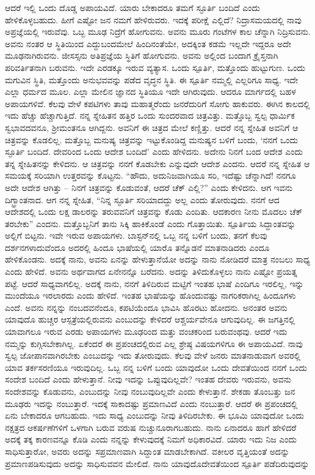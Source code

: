 ಆದರೆ ಇಲ್ಲಿ ಒಂದು ದೊಡ್ಡ ಅಪಾಯವಿದೆ. ಯಾರು ಬೇಕಾದರೂ ತಮಗೆ ಸ್ಫೂರ್ತಿ ಬಂದಿದೆ ಎಂದು ಹೇಳಿಕೊಳ್ಳಬಹುದು. ಹೀಗೆ ಎಷ್ಟೋ ಜನ ನಮಗೆ ಹೇಳಿರುವರು. ಇದಕ್ಕೆ ಪರೀಕ್ಷೆ ಎಲ್ಲಿದೆ? ನಿದ್ರಾಸಮಯದಲ್ಲಿ ನಾವು ಅಪ್ರಜ್ಞೆಯಲ್ಲಿ ಇರುವೆವು. ಒಬ್ಬ ಮೂಢ ನಿದ್ರೆಗೆ ಹೋಗುವನು. ಅವನು ಮೂರು ಗಂಟೆಗಳ ಕಾಲ ಚೆನ್ನಾಗಿ ನಿದ್ರಿಸುವನು. ಅವನು ನಂತರ ಆ ಸ್ಥಿತಿಯಿಂದ ಎದ್ದುಬಂದಮೇಲೆ ಹಿಂದಿನಂತೆಯೇ, ಅದಕ್ಕಿಂತ ಕಡಮೆ ಇಲ್ಲದೇ ಇದ್ದರೂ ಅದೇ ಮೂಢನಾಗಿರುವನು. ಜೀಸಸ್ಸನು ಅತಿಪ್ರಜ್ಞೆಯ ಸ್ಥಿತಿಗೆ ಹೋಗುವನು. ಅವನು ಅಲ್ಲಿಂದ ಬಂದಾಗ ಕ್ರೈಸ್ತನಾಗಿ ಪರಿವರ್ತಿತನಾಗಿ ಬರುವನು. ಇದೇ ಎರಡಕ್ಕೂ ಇರುವ ವ್ಯತ್ಯಾಸ. ಒಂದು ಸ್ಪೂರ್ತಿ, ಮತ್ತೊಂದು ಹುಟ್ಟುಗುಣ. ಒಂದು ಮಗುವಿನ ಸ್ಥಿತಿ, ಮತ್ತೊಂದು ಅನುಭವವನ್ನು ಪಡೆದ ವೃದ್ಧನ ಸ್ಥಿತಿ. ಈ ಸ್ಪೂರ್ತಿ ನಮ್ಮಲ್ಲಿ ಎಲ್ಲರಿಗೂ ಸಾಧ್ಯ. ಇದೇ ಎಲ್ಲಾ ಧರ್ಮದ ಮೂಲ. ಎಲ್ಲಾ ಮೇಲಿನ ಜ್ಞಾನದ ಸ್ಥಿತಿಯೂ ಇದೇ ಆಗಿರುವುದು. ಆದರೂ ಮಾರ್ಗದಲ್ಲಿ ಬಹಳ ಅಪಾಯಗಳಿವೆ. ಕೆಲವು ವೇಳೆ ಕಪಟಿಗಳು ತಾವು ಮಹಾತ್ಮರೆಂದು ಜನರೆದುರಿಗೆ ಸೋಗು ಹಾಕುವರು. ಈಗಿನ ಕಾಲದಲ್ಲಿ ಇದು ಹೆಚ್ಚು ಹೆಚ್ಚಾಗುತ್ತಿದೆ. ನನ್ನ ಸ್ನೇಹಿತನ ಹತ್ತಿರ ಒಂದು ಸುಂದರವಾದ ಚಿತ್ರವಿತ್ತು. ಮತ್ತೊಬ್ಬ ಸ್ವಲ್ಪ ಧಾರ್ಮಿಕ ಸ್ವಭಾವದವನೂ, ಶ‍್ರೀಮಂತನೂ ಆಗಿದ್ದನು. ಅವನಿಗೆ ಈ ಚಿತ್ರದ ಮೇಲೆ ಕಣ್ಣಿತ್ತು. ಆದರೆ ನನ್ನ ಸ್ನೇಹಿತ ಅವನಿಗೆ ಆ ಚಿತ್ರವನ್ನು ಕೊಡಲಿಲ್ಲ. ಮತ್ತೊಬ್ಬ ಮನುಷ್ಯ ಚಿತ್ರವನ್ನು ಇಟ್ಟುಕೊಂಡಿದ್ದ ಮನುಷ್ಯನ ಬಳಿಗೆ ಬಂದು, `ನನಗೆ ಒಂದು ಸ್ಫೂರ್ತಿ ಬಂದಿದೆ. ದೇವರಿಂದ ಒಂದು ಆದೇಶ ಬಂದಿದೆ' ಎಂದು ಹೇಳಿದನು. ಅದೇನು ನಿನಗೆ ಬಂದ ಆದೇಶ ಎಂದು ತನ್ನ ಸ್ನೇಹಿತನನ್ನು ಕೇಳಿದನು. ಆ ಚಿತ್ರವನ್ನು ನನಗೆ ಕೊಡಬೇಕು ಎನ್ನುವುದೇ ಆದೇಶ ಎಂದನು. ಆದರೆ ನನ್ನ ಸ್ನೇಹಿತ ಆ ಸಮಯಕ್ಕೆ ಸರಿಯಾಗಿ ಉತ್ತರವನ್ನು ಕೊಟ್ಟನು. “ಹೌದು, ಅದು\break ನಿಜವಾಗಿಯೂ ಸರಿ, ಇದೆಷ್ಟು ಚೆನ್ನಾಗಿದೆ! ನನಗೂ ಅದೇ ಆದೇಶ ಆಗಿತ್ತು – ನಿನಗೆ ಚಿತ್ರವನ್ನು ಕೊಡುವಂತೆ, ಆದರೆ ಚೆಕ್ ಎಲ್ಲಿ?” ಎಂದು ಕೇಳಿದನು. ಆಗ ಇವನು ದಿಗ್ಭ್ರಾಂತನಾದ. ಆಗ ನನ್ನ ಸ್ನೇಹಿತ, “ನಿನ್ನ ಸ್ಫೂರ್ತಿ ಸರಿಯಾದದ್ದು ಅಲ್ಲ ಎಂದು ತೋರುವುದು. ನನಗೆ ಆದ ಆದೇಶದಲ್ಲಿ ಒಂದು ಲಕ್ಷ ಡಾಲರನ್ನು ತರುವವನಿಗೆ ಚಿತ್ರವನ್ನು ಕೊಡು ಎಂದಿತು. ಆದಕಾರಣ ನೀನು ಮೊದಲು ಚೆಕ್ ತರಬೇಕು'' ಎಂದನು. ಮತ್ತೊಬ್ಬನಿಗೆ ತಾನು ಸಿಕ್ಕಿ ಹಾಕಿಕೊಂಡೆ ಎಂದು ಗೊತ್ತಾಯಿತು. ಸ್ಪೂರ್ತಿಯ ಸಿದ್ದಾಂತವನ್ನು ಅಲ್ಲಿಗೆ ಬಿಟ್ಟನು. ಇವೇ ಇರುವ ಅಪಾಯಗಳು. ಬಾಸ್ಟನ್‌ನಲ್ಲಿ ಒಬ್ಬ ನನ್ನ ಬಳಿಗೆ ಬಂದು, ತನಗೆ ಕೆಲವು ದರ್ಶನಗಳಾದುವೆಂದೂ ಅದರಲ್ಲಿ ಹಿಂದೂ ಭಾಷೆಯಲ್ಲಿ ಯಾರೊ ತನ್ನೊಡನೆ ಮಾತನಾಡಿದರು ಎಂದೂ ಹೇಳಿಕೊಂಡನು. ಅದಕ್ಕೆ ನಾನು, ಅವನು ಏನನ್ನು ಹೇಳುತ್ತಾನೆಯೋ ಅದನ್ನು ನಾನು ನೋಡಿದರೆ ಮಾತ್ರ ನಂಬಲು ಸಾಧ್ಯ ಎಂದು ಹೇಳಿದೆ. ಅವನು ಅರ್ಥವಾಗದ ಏನೇನನ್ನೊ ಬರೆದನು. ಅದನ್ನು ತಿಳಿದುಕೊಳ್ಳಲು ನಾನು ಎಷ್ಟೋ ಪ್ರಯತ್ನ ಪಟ್ಟೆ. ಆದರೆ ಸಾಧ್ಯವಾಗಲಿಲ್ಲ. ಅದಕ್ಕೆ ನಾನು, ನನಗೆ ತಿಳಿದಿರುವ ಮಟ್ಟಿಗೆ ಇಂತಹ ಭಾಷೆ ಎಂದಿಗೂ ಇರಲಿಲ್ಲ, ಇನ್ನು ಮುಂದೆಯೂ ಇರಲಾರದು ಎಂದು ಹೇಳಿದೆ. ಇಂತಹ ಭಾಷೆಯನ್ನು ಹೊಂದುವಷ್ಟು ನಾಗರಿಕರಾಗಿಲ್ಲ ಹಿಂದೂಗಳು ಎಂದೆ. ಅವನು ನನ್ನನ್ನು ನಂಬದವನೆಂದೂ, ಕಪಟಿಯೆಂದೂ ಭಾವಿಸಿ ಹೊರಟು ಹೋದನು. ಅನಂತರ ಅವನು ಯಾವುದೊ ಹುಚ್ಚರ ಆಸ್ಪತ್ರೆಯಲ್ಲಿರುವನು ಎಂಬುದನ್ನು ಕೇಳಿದರೆ ಆಶ್ಚರ್ಯವೇನೂ ಆಗುವುದಿಲ್ಲ. ಈ ಜಗತ್ತಿನಲ್ಲಿ ಯಾವಾಗಲೂ ಇರುವ ಎರಡು ಅಪಾಯಗಳು ಮೂಢರಿಂದ ಮತ್ತು ವಂಚಕರಿಂದ ಬರುವಂಥವು. ಆದರೆ ಇದು ನಮ್ಮನ್ನು ಕುಗ್ಗಿಸಬೇಕಾಗಿಲ್ಲ. ಏಕೆಂದರೆ ಈ ಪ್ರಪಂಚದಲ್ಲಿರುವ ಎಲ್ಲ ಶ್ರೇಷ್ಠ ವಿಷಯಗಳಿಗೂ ಈ ಅಪಾಯವಿದೆ. ನಾವು ಸ್ವಲ್ಪ ಜೋಪಾನವಾಗಿರಬೇಕು ಎಂಬುದನ್ನು ಇದು ತೋರುವುದು. ಕೆಲವು ವೇಳೆ ಜನರು ಮಾತನಾಡುವಾಗ ಅವರಲ್ಲಿ ಯಾವ ತರ್ಕಸರಣಿಯೂ ಇರುವುದಿಲ್ಲ. ಒಬ್ಬ ನನ್ನ ಬಳಿಗೆ ಬಂದು ಯಾವುದೋ ಒಂದು ದೇವತೆಯಿಂದ ನನಗೆ ಒಂದು ಸಂದೇಶ ಬಂದಿದೆ ಎಂದು ಹೇಳುತ್ತಾನೆ. ನೀವು ಇದನ್ನು ಒಪ್ಪುವುದಿಲ್ಲವೇ? ಇಂತಹ ದೇವರು ಇರುವನು, ಅವನು ಸಂದೇಶವನ್ನು ಕೊಡುವನು, ಎಂಬುದನ್ನು ನೀವು ನಂಬುವುದಿಲ್ಲವೇ ಎಂದು ಕೇಳುತ್ತಾನೆ. ಶೇಕಡಾ ತೊಂಬತ್ತು ಜನ ಮೂಢರು ಇದನ್ನು ನಂಬುತ್ತಾರೆ. ಇದಕ್ಕೆ ಸಾಕಾದಷ್ಟು ಪ್ರಮಾಣವಿದೆ ಎಂದು ನಂಬುತ್ತಾರೆ. ಆದರೆ ಈ ಪ್ರಪಂಚದಲ್ಲಿ ಏನು ಬೇಕಾದರೂ ಆಗಬಹುದು. ಇದು ಸಾಧ್ಯ ಎಂಬುದನ್ನು ನೀವು ತಿಳಿದಿರಬೇಕು. ಈ ಭೂಮಿ ಯಾವುದೋ ಒಂದು ನಕ್ಷತ್ರದ ಆಕರ್ಷಣೆಗಳಿಗೆ ಒಳಗಾಗಿ ಬರುವ ವರುಷ ನುಚ್ಚುನೂರಾಗಬಹುದು. ನಾನು ಏನಾದರೂ ಹಾಗೆ ಹೇಳಿದರೆ ಅದಕ್ಕೆ ತಕ್ಕ ಕಾರಣವನ್ನೂ ಕೊಡಿ ಎಂದು ನನ್ನನ್ನು ಕೇಳುವುದಕ್ಕೆ ನಿಮಗೆ ಅಧಿಕಾರವಿದೆ. ಯಾರು ಇದು ನಿಜ ಎಂದು ಸಾಧಿಸುತ್ತಾರೋ, ಅವರು ಅದನ್ನು ಸಪ್ರಮಾಣವಾಗಿ ಸಿದ್ದಾಂತ ಮಾಡಬೇಕಾಗಿದೆ. ವಕೀಲರ ವೃತ್ತಿಯಂತೆ ಅದನ್ನು ಪ್ರಮಾಣಪಡಿಸುವುದು ಅದನ್ನು ಸಾಧಿಸುವವನ ಮೇಲಿದೆ. ನಾನು ಯಾವುದೊ\break ದೇವತೆಯಿಂದ ಸ್ಪೂರ್ತಿ ಪಡೆದಿರುವುದನ್ನು 